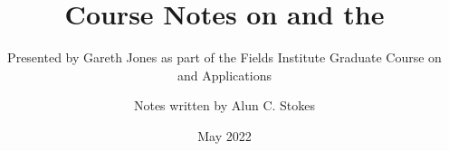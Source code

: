 \documentclass[graybox,envcountchap]{svmono}
\date{May 2022}
\begin{document}
\author{Notes written by Alun C. Stokes}
\title{Course Notes on \Omy and the \pwT}
\subtitle{Presented by Gareth Jones as part of the Fields Institute Graduate Course on \Omy and Applications}
\maketitle
\frontmatter%


%



\tableofcontents




\mainmatter%

  
  
  
  
  
  
  
%


  
  
  
  
  





\backmatter%

\printindex

\end{document}
